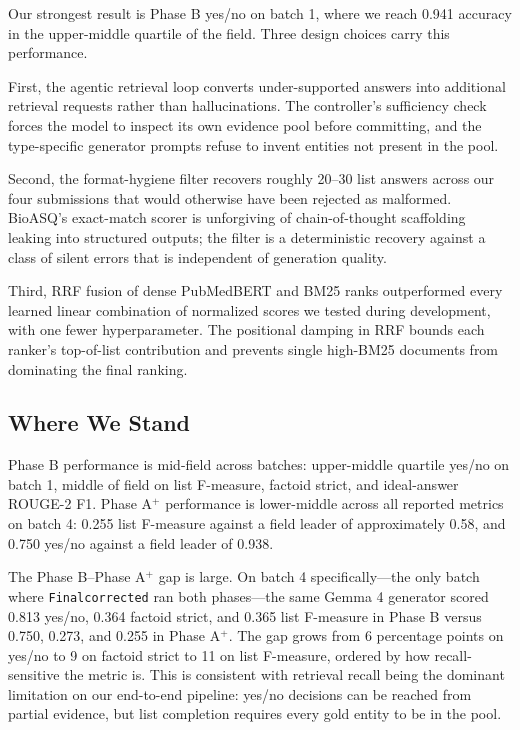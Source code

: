 \documentclass[sigconf,natbib=true]{ceurart}
\begin{document}
Our strongest result is Phase B yes/no on batch 1, where we reach 0.941 accuracy in the upper-middle quartile of the field. Three design choices carry this performance.

First, the agentic retrieval loop converts under-supported answers into additional retrieval requests rather than hallucinations. The controller's sufficiency check forces the model to inspect its own evidence pool before committing, and the type-specific generator prompts refuse to invent entities not present in the pool.

Second, the format-hygiene filter recovers roughly 20--30 list answers across our four submissions that would otherwise have been rejected as malformed. BioASQ's exact-match scorer is unforgiving of chain-of-thought scaffolding leaking into structured outputs; the filter is a deterministic recovery against a class of silent errors that is independent of generation quality.

Third, RRF fusion of dense PubMedBERT and BM25 ranks outperformed every learned linear combination of normalized scores we tested during development, with one fewer hyperparameter. The positional damping in RRF bounds each ranker's top-of-list contribution and prevents single high-BM25 documents from dominating the final ranking.

\subsection{Where We Stand}

Phase B performance is mid-field across batches: upper-middle quartile yes/no on batch 1, middle of field on list F-measure, factoid strict, and ideal-answer ROUGE-2 F1. Phase A$^+$ performance is lower-middle across all reported metrics on batch 4: 0.255 list F-measure against a field leader of approximately 0.58, and 0.750 yes/no against a field leader of 0.938.

The Phase B--Phase A$^+$ gap is large. On batch 4 specifically---the only batch where \texttt{Finalcorrected} ran both phases---the same Gemma 4 generator scored 0.813 yes/no, 0.364 factoid strict, and 0.365 list F-measure in Phase B versus 0.750, 0.273, and 0.255 in Phase A$^+$. The gap grows from 6 percentage points on yes/no to 9 on factoid strict to 11 on list F-measure, ordered by how recall-sensitive the metric is. This is consistent with retrieval recall being the dominant limitation on our end-to-end pipeline: yes/no decisions can be reached from partial evidence, but list completion requires every gold entity to be in the pool.
\end{document}
